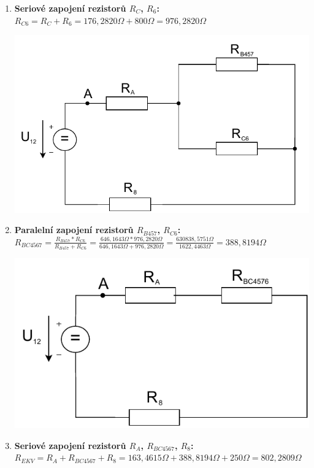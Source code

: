 \begin{enumerate}
    \item \textbf{Seriové zapojení rezistorů $R_C$, $R_6$:} \newline
    $R_{C6} = R_C + R_6 = 176,2820\Omega + 800\Omega = 976,2820\Omega$
    
    \begin{center}
    \includegraphics[scale=0.7]{pr1/pr1.5.pdf}
    \end{center}
  
    \item \textbf{Paralelní zapojení rezistorů $R_{B457}$, $R_{C6}$:} \newline
    $R_{BC4567} = \frac{R_{B457} * R_{C6}}{R_{B457} + R_{C6}} = \frac{646,1643\Omega * 976,2820\Omega}{646,1643\Omega + 976,2820\Omega} = \frac{630838,5751\Omega}{1622,4463\Omega} = 388,8194\Omega$
    
    \begin{center}
    \includegraphics[scale=0.7]{pr1/pr1.6.pdf}
    \end{center}
    
    \item \textbf{Seriové zapojení rezistorů $R_A$, $R_{BC4567}$, $R_8$:} \newline
    $R_{EKV} = R_A + R_{BC4567} + R_8 = 163,4615\Omega + 388,8194\Omega + 250\Omega = 802,2809\Omega$
    

\end{enumerate}
